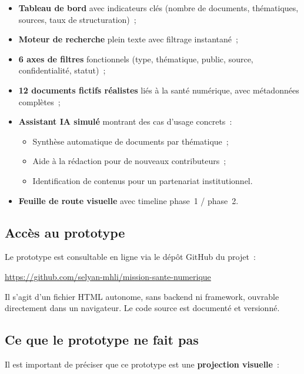 \documentclass[12pt, a4paper]{article}
\begin{document}
\begin{itemize}[leftmargin=1.5em]
  \item \textbf{Tableau de bord} avec indicateurs clés (nombre de documents, thématiques, sources, taux de structuration)~;
  \item \textbf{Moteur de recherche} plein texte avec filtrage instantané~;
  \item \textbf{6 axes de filtres} fonctionnels (type, thématique, public, source, confidentialité, statut)~;
  \item \textbf{12 documents fictifs réalistes} liés à la santé numérique, avec métadonnées complètes~;
  \item \textbf{Assistant IA simulé} montrant des cas d'usage concrets~:
    \begin{itemize}[leftmargin=1em]
      \item Synthèse automatique de documents par thématique~;
      \item Aide à la rédaction pour de nouveaux contributeurs~;
      \item Identification de contenus pour un partenariat institutionnel.
    \end{itemize}
  \item \textbf{Feuille de route visuelle} avec timeline phase~1 / phase~2.
\end{itemize}

\subsection{Accès au prototype}

Le prototype est consultable en ligne via le dépôt GitHub du projet~:

\begin{keybox}
\centering
{}\quad\url{https://github.com/selyan-mhli/mission-sante-numerique}

\medskip

\small Il s'agit d'un fichier HTML autonome, sans backend ni framework, ouvrable directement dans un navigateur. Le code source est documenté et versionné.
\end{keybox}

\subsection{Ce que le prototype ne fait pas}

Il est important de préciser que ce prototype est une \textbf{projection visuelle}~:
\end{document}

